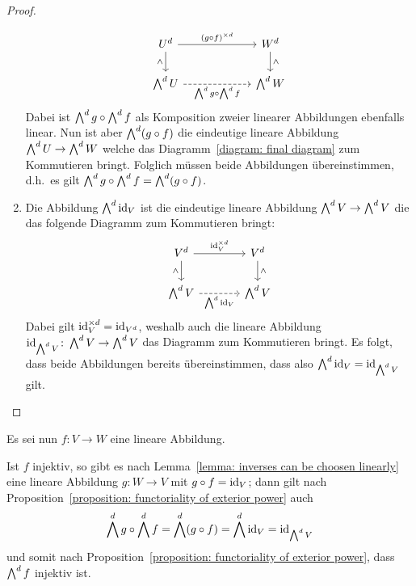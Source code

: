 \begin{proof}
\begin{enumerate}
\begin{equation}
\begin{tikzcd}[column sep = 6em]
            U^d
            \arrow{r}{(g \circ f)^{\times d}}
            \arrow[swap]{d}{\wedge}
          & W^d
            \arrow{d}{\wedge}
          \\
            \exteriorpower{d}{U}
            \arrow[swap, dashed]{r}{\exteriorpower{d}{g}\circ \exteriorpower{d}{f}}
          & \exteriorpower{d}{W}
        \end{tikzcd}
      \end{equation}
      Dabei ist $\bigwedge^{d} g \circ \bigwedge^{d} f$ als Komposition zweier linearer Abbildungen ebenfalls linear.
      Nun ist aber $\bigwedge^{d} (g \circ f)$ die eindeutige lineare Abbildung $\bigwedge^{d} U \to \bigwedge^{d} W$ welche das Diagramm~\eqref{diagram: final diagram} zum Kommutieren bringt.
      Folglich müssen beide Abbildungen übereinstimmen, d.h.\ es gilt $\bigwedge^{d} g \circ \bigwedge^{d} f = \bigwedge^{d} (g \circ f)$.
      
    \item
      Die Abbildung $\bigwedge^{d} \operatorname{id}_V$ ist die eindeutige lineare Abbildung $\bigwedge^{d} V \to \bigwedge^{d} V$ die das folgende Diagramm zum Kommutieren bringt:
      \[
        \begin{tikzcd}[column sep = large]
            V^d
            \arrow{r}{\id_V^{\times d}}
            \arrow[swap]{d}{\wedge}
          & V^d
            \arrow{d}{\wedge}
          \\
            \exteriorpower{d}{V}
            \arrow[swap, dashed]{r}{\exteriorpower{d}{\id_V}}
          & \exteriorpower{d}{V}
        \end{tikzcd}
      \]
      Dabei gilt $\operatorname{id}_V^{\times d} = \operatorname{id}_{V^d}$, weshalb auch die lineare Abbildung $\operatorname{id}_{\bigwedge^{d} V} \colon \bigwedge^{d} V \to \bigwedge^{d} V$ das Diagramm zum Kommutieren bringt.
      Es folgt, dass beide Abbildungen bereits übereinstimmen, dass also $\bigwedge^{d} \operatorname{id}_V = \operatorname{id}_{\bigwedge^{d} V}$ gilt.
    \qedhere
  \end{enumerate}
\end{proof}

Es sei nun $f \colon V \to W$ eine lineare Abbildung.

Ist $f$ injektiv, so gibt es nach Lemma~\ref{lemma: inverses can be choosen linearly} eine lineare Abbildung $g \colon W \to V$ mit $g \circ f = \operatorname{id}_V$;
dann gilt nach Proposition~\ref{proposition: functoriality of exterior power} auch
\[
    \bigwedge^{d} g \circ \bigwedge^{d} f
  = \bigwedge^{d} (g \circ f)
  = \bigwedge^{d} \operatorname{id}_V
  = \operatorname{id}_{\bigwedge^{d} V}
\]
und somit nach Proposition~\ref{proposition: functoriality of exterior power}, dass $\bigwedge^{d} f$ injektiv ist.

